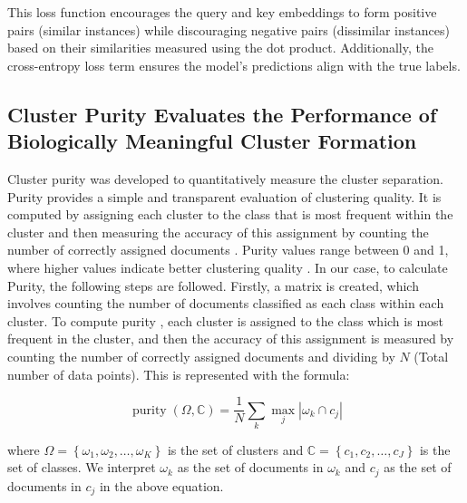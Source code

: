 \documentclass[12pt,a4paper]{article}
\begin{document}
This loss function encourages the query and key embeddings to form positive pairs (similar instances) while discouraging negative pairs (dissimilar instances) based on their similarities measured using the dot product. Additionally, the cross-entropy loss term ensures the model's predictions align with the true labels.

\subsection{Cluster Purity Evaluates the Performance of Biologically Meaningful Cluster Formation}
\label{cp}

Cluster purity was developed to quantitatively measure the cluster separation. Purity provides a simple and transparent evaluation of clustering quality. It is computed by assigning each cluster to the class that is most frequent within the cluster and then measuring the accuracy of this assignment by counting the number of correctly assigned documents \cite{ISBN_0521865719}. Purity values range between 0 and 1, where higher values indicate better clustering quality \cite{ISBN_0521865719}. In our case, to calculate Purity, the following steps are followed. Firstly, a matrix is created, which involves counting the number of documents classified as each class within each cluster. To compute purity , each cluster is assigned to the class which is most frequent in the cluster, and then the accuracy of this assignment is measured by counting the number of correctly assigned documents and dividing by $N$ (Total number of data points). This is represented with the formula:

$$
\operatorname{purity}(\Omega, \mathbb{C})=\frac{1}{N} \sum_k \max _j\left|\omega_k \cap c_j\right|
$$

where $\Omega=\left\{\omega_1, \omega_2, \ldots, \omega_K\right\}$ is the set of clusters and $\mathbb{C}=\left\{c_1, c_2, \ldots, c_J\right\}$ is the set of classes. We interpret $\omega_k$ as the set of documents in $\omega_k$ and $c_j$ as the set of documents in $c_j$ in the above equation.

\end{document}
